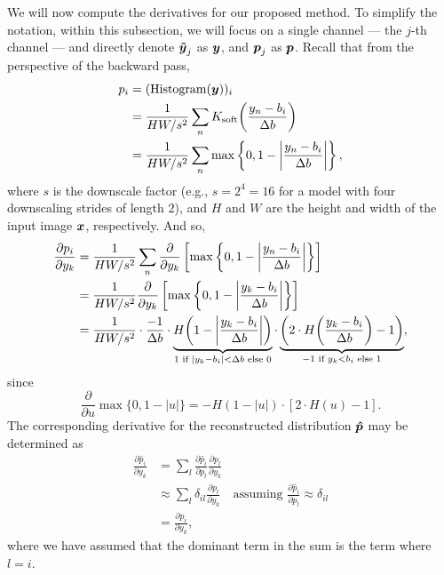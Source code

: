 We will now compute the derivatives for our proposed method.
To simplify the notation, within this subsection, we will focus on a single channel --- the $j$-th channel --- and directly denote ${\boldsymbol{\tilde{y}}}_j$ as ${\boldsymbol{y}}$, and ${\boldsymbol{p}}_j$ as ${\boldsymbol{p}}$.
Recall that from the perspective of the backward pass,
%
\begin{equation*}
  \begin{split}
    p_i
    &= (\operatorname{Histogram}({\boldsymbol{y}}))_i \\
    &= \frac{1}{H W / s^2}
      \sum_n K_{\mathrm{soft}}{\left(\frac{y_n - b_i}{\Delta b}\right)} \\
    &= \frac{1}{H W / s^2}
      \sum_n \max \left\{ 0, 1 - \left| \frac{y_n - b_i}{\Delta b} \right| \right\},
  \end{split}
\end{equation*}
%
where $s$ is the downscale factor (e.g., $s = 2^4 = 16$ for a model with four downscaling strides of length $2$), and $H$ and $W$ are the height and width of the input image ${\boldsymbol{x}}$, respectively.
And so,
%
\begin{equation*}
  \begin{split}
    \frac{\partial p_i}{\partial y_k}
    &= \frac{1}{H W / s^2}
      \sum_n \frac{\partial}{\partial y_k} \left[
        \max \left\{ 0, 1 - \left| \frac{y_n - b_i}{\Delta b} \right| \right\}
      \right] \\
    &= \frac{1}{H W / s^2}
      \frac{\partial}{\partial y_k} \left[
        \max \left\{ 0, 1 - \left| \frac{y_k - b_i}{\Delta b} \right| \right\}
      \right] \\
    &= \frac{1}{H W / s^2} \cdot
      \frac{-1}{\Delta b} \cdot
      \underbrace{%
        H{\left( 1 - \left| \frac{y_k - b_i}{\Delta b} \right| \right)}
      }_{1 \text{ if } |y_k - b_i| < \Delta b \text{ else } 0}
      \cdot
      \underbrace{%
        \left( 2 \cdot H{\left( \frac{y_k - b_i}{\Delta b} \right)} - 1 \right)
      }_{-1 \text{ if } y_k < b_i \text{ else } 1},
  \end{split}
\end{equation*}
%
since
%
\begin{equation*}
  \frac{\partial}{\partial u} \max \{ 0, 1 - |u| \}
  = - H(1 - |u|) \cdot [2 \cdot H(u) - 1].
\end{equation*}
%
The corresponding derivative for the reconstructed distribution ${\boldsymbol{\hat{p}}}$ may be determined as
%
\begin{equation*}
  \begin{split}
    \frac{\partial \hat{p}_i}{\partial y_k}
    &= \sum_l
      \frac{\partial \hat{p}_i}{\partial p_l}
      \frac{\partial p_l}{\partial y_k}
    \\
    &\approx \sum_l
      \delta_{il}
      \frac{\partial p_l}{\partial y_k}
      \quad \text{assuming } \frac{\partial \hat{p}_i}{\partial p_l} \approx \delta_{il}
    \\
    &= \frac{\partial p_i}{\partial y_k},
  \end{split}
\end{equation*}
where we have assumed that the dominant term in the sum is the term where $l = i$.

